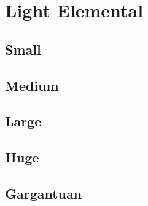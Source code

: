 \section{Light Elemental}

\subsection{Small}

\subsection{Medium}

\subsection{Large}

\subsection{Huge}

\subsection{Gargantuan}